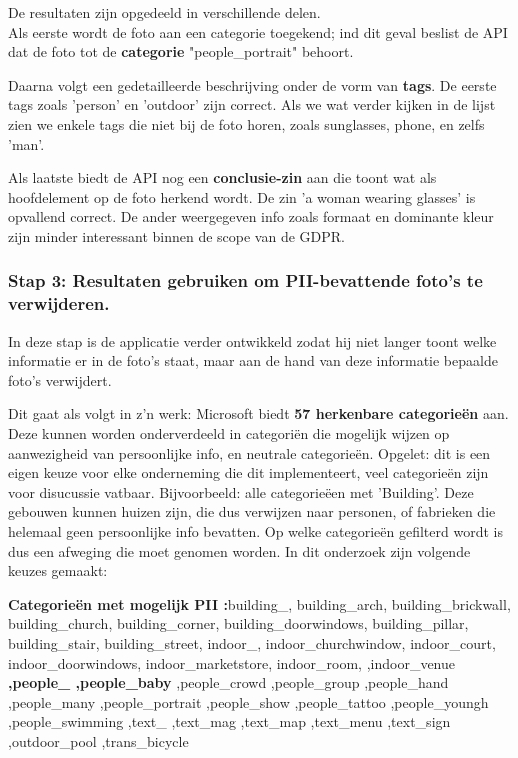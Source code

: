 De resultaten zijn opgedeeld in verschillende delen.\\ Als eerste wordt de foto aan een categorie toegekend; ind dit geval beslist de API dat de foto tot de \textbf{categorie} "people\_portrait" behoort. 

Daarna volgt een gedetailleerde beschrijving onder de vorm van \textbf{tags}. De eerste tags zoals 'person' en 'outdoor' zijn correct. Als we wat verder kijken in de lijst zien we enkele tags die niet bij de foto horen, zoals sunglasses, phone, en zelfs 'man'. 

Als laatste biedt de API nog een \textbf{conclusie-zin} aan die toont wat als hoofdelement op de foto herkend wordt. De zin 'a woman wearing glasses' is opvallend correct. 
De ander weergegeven info zoals formaat en dominante kleur zijn minder interessant binnen de scope van de GDPR.

\subsubsection{Stap 3: Resultaten gebruiken om PII-bevattende foto's te verwijderen.}
In deze stap is de applicatie verder ontwikkeld zodat hij niet langer toont welke informatie er in de foto's staat, maar aan de hand van deze informatie bepaalde foto's verwijdert. 

Dit gaat als volgt in z'n werk: Microsoft biedt \textbf{57 herkenbare categorieën} aan. Deze kunnen worden onderverdeeld in categoriën die mogelijk wijzen op aanwezigheid van persoonlijke info, en neutrale categorieën. Opgelet: dit is een eigen keuze voor elke onderneming die dit implementeert, veel categorieën zijn voor disucussie vatbaar. Bijvoorbeeld: alle categorieëen met 'Building'. Deze gebouwen kunnen huizen zijn, die dus verwijzen naar personen, of fabrieken die helemaal geen persoonlijke info bevatten. Op welke categorieën gefilterd wordt is dus een afweging die moet genomen worden. 
In dit onderzoek zijn volgende keuzes gemaakt: 

\textbf{Categorieën met mogelijk PII :}building\_, building\_arch, building\_brickwall, building\_church, building\_corner, building\_doorwindows, building\_pillar, building\_stair, building\_street, indoor\_, indoor\_churchwindow, indoor\_court, indoor\_doorwindows, indoor\_marketstore,
indoor\_room, 
,indoor\_venue \textbf{,people\_ ,people\_baby}
,people\_crowd
,people\_group
,people\_hand
,people\_many
,people\_portrait
,people\_show
,people\_tattoo
,people\_youngh
,people\_swimming
,text\_
,text\_mag
,text\_map
,text\_menu
,text\_sign
,outdoor\_pool ,trans\_bicycle

